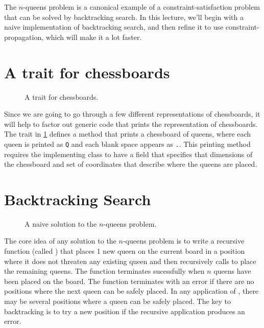 \documentclass[9pt]{extbook}
\begin{document}
The $n$-queens problem is a canonical example of a constraint-satisfaction
problem that can be solved by backtracking search. In this lecture, we'll
begin with a naive implementation of backtracking search, and then refine
it to use constraint-propagation, which will make it a lot faster.

\section{A trait for chessboards}

\begin{figure}
\caption{A trait for chessboards.}
\label{ChessBoardLike}
\end{figure}

Since we are going to go through a few different representations of chessboards,
it will help to factor out generic code that prints the representation of
chessboards. The  trait in \cref{ChessBoardLike}
defines a  method that prints a chessboard of queens,
where each queen is printed as \texttt{Q} and each blank space appears as
\texttt{.}. This printing method requires the implementing class to have
a field that specifies that dimensions of the chessboard and set of coordinates
that describe where the queens are placed.

\section{Backtracking Search}

\begin{figure}
\caption{A naive solution to the $n$-queens problem.}
\label{NaiveQueens}
\end{figure}

The core idea of any solution to the $n$-queens problem is to write a recursive
function (called ) that places 1 new queen on the current
board in a position where it does not threaten any existing queen and then
recursively calls  to place the remaining queens. The
function terminates sucessfully when $n$ queens have been placed on the board.
The function terminates with an error if there are no positions where the next
queen can be safely placed. In any application of , there may
be several positions where a queen can be safely placed. The key to backtracking
is to try a new position if the recursive application produces an error.
\end{document}
